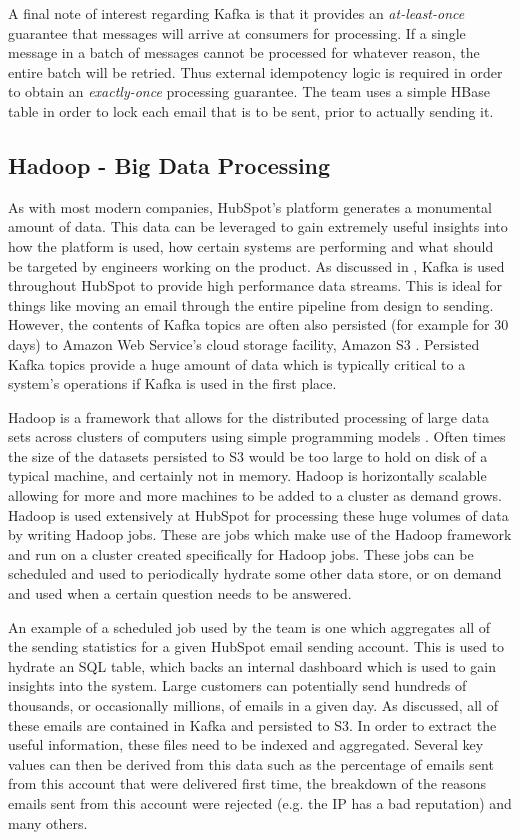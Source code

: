 A final note of interest regarding Kafka is that it provides an \textit{at-least-once} guarantee that messages will arrive at consumers for processing. If a single message in a batch of messages cannot be processed for whatever reason, the entire batch will be retried. Thus external idempotency logic is required in order to obtain an \textit{exactly-once} processing guarantee. The \team{} team uses a simple HBase table in order to lock each email that is to be sent, prior to actually sending it. 

\subsection{Hadoop - Big Data Processing}\label{sec:hadoop}
 As with most modern companies, HubSpot's platform generates a monumental amount of data. This data can be leveraged to gain extremely useful insights into how the platform is used, how certain systems are performing and what should be targeted by engineers working on the product. As discussed in , Kafka is used throughout HubSpot to provide high performance data streams. This is ideal for things like moving an email through the entire pipeline from design to sending. However, the contents of Kafka topics are often also persisted (for example for 30 days) to Amazon Web Service's cloud storage facility, Amazon S3 \cite{s3} . Persisted Kafka topics provide a huge amount of data which is typically critical to a system's operations if Kafka is used in the first place. 
 
 Hadoop is a framework that allows for the distributed processing of large data sets across clusters of computers using simple programming models \cite{hadoop}. Often times the size of the datasets persisted to S3 would be too large to hold on disk of a typical machine, and certainly not in memory. Hadoop is horizontally scalable allowing for more and more machines to be added to a cluster as demand grows. Hadoop is used extensively at HubSpot for processing these huge volumes of data by writing Hadoop jobs. These are jobs which make use of the Hadoop framework and run on a cluster created specifically for Hadoop jobs. These jobs can be scheduled and used to periodically hydrate some other data store, or on demand and used when a certain question needs to be answered. 
 
 An example of a scheduled job used by the \team{} team is one which aggregates all of the sending statistics for a given HubSpot email sending account. This is used to hydrate an SQL table, which backs an internal dashboard which is used to gain insights into the system. Large customers can potentially send hundreds of thousands, or occasionally millions, of emails in a given day. As discussed, all of these emails are contained in Kafka and persisted to S3. In order to extract the useful information, these files need to be indexed and aggregated. Several key values can then be derived from this data such as the percentage of emails sent from this account that were delivered first time, the breakdown of the reasons emails sent from this account were rejected (e.g. the IP has a bad reputation) and many others.

